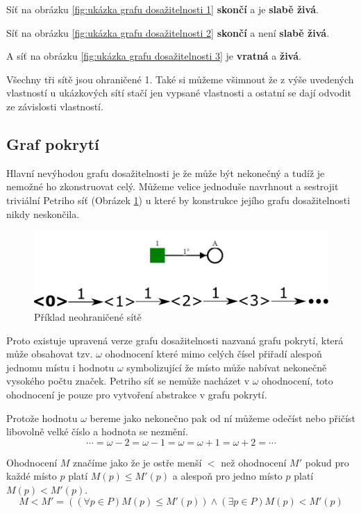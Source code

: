 \documentclass[
  biblatex,
  glossaries,
  index
]{kidiplom}
\begin{document}
Síť na obrázku \ref{fig:ukázka grafu dosažitelnosti 1} \textbf{skončí} a je \textbf{slabě živá}.

Síť na obrázku \ref{fig:ukázka grafu dosažitelnosti 2} \textbf{skončí} a není \textbf{slabě živá}.

A síť na obrázku \ref{fig:ukázka grafu dosažitelnosti 3} je \textbf{vratná} a \textbf{živá}.

Všechny tři sítě jsou ohraničené 1. Také si můžeme všimnout že 
z výše uvedených vlastností u ukázkových sítí 
stačí jen vypsané vlastnosti a ostatní se dají odvodit ze závislosti vlastností.

\clearpage

\subsection{Graf pokrytí}

Hlavní nevýhodou grafu dosažitelnosti je že může být
nekonečný a tudíž je nemožné ho zkonstruovat celý.
Můžeme velice jednoduše navrhnout a sestrojit triviální Petriho síť (Obrázek \ref{fig:neohraničená síť}) u které by konstrukce jejího grafu dosažitelnosti nikdy neskončila.

\begin{figure}[h]
  \centering
  \includegraphics[width=\linewidth]{net_unbounded_reachability}
  \caption{Příklad neohraničené sítě}\label{fig:neohraničená síť}
\end{figure}

Proto existuje upravená verze grafu dosažitelnosti nazvaná grafu pokrytí,
která může obsahovat tzv. $\omega$ ohodnocení které mimo celých 
čísel přiřadí alespoň jednomu místu i hodnotu $\omega$ 
symbolizující že místo může nabívat nekonečně vysokého počtu značek.
Petriho síť se nemůže nacházet v $\omega$ ohodnocení, toto ohodnocení je pouze
pro vytvoření abstrakce v grafu pokrytí.

Protože hodnotu $\omega$ bereme jako nekonečno pak od ní můžeme 
odečíst nebo přičíst libovolně velké číslo a hodnota se nezmění.
$$\dotsb = \omega - 2 = \omega - 1 = \omega = \omega + 1 = \omega + 2 = \dotsb$$

Ohodnocení $M$ značíme jako že je ostře menší $<$ než ohodnocení $M'$
pokud pro každé místo $p$ platí $M(p) \leq M'(p)$ a alespoň pro jedno
místo $p$ platí $M(p) < M'(p)$.
$$
 M<M' = ((\forall p \in P) M(p) \leq M'(p)) \land (\exists p \in P) M(p) < M'(p)
$$
\end{document}
